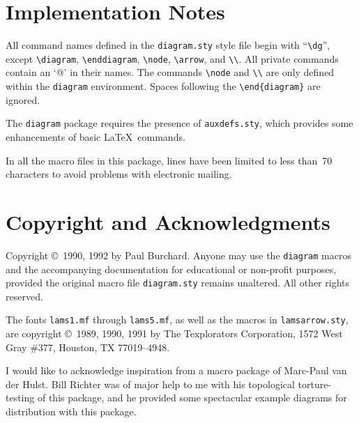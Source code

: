 \section{Implementation Notes}

All command names defined in the \verb"diagram.sty" style file
begin with ``\verb"\dg"'', except \verb"\diagram",
\verb"\enddiagram", \verb"\node", \verb"\arrow",
and \verb"\\".  All private commands contain an `@' in their 
names.  The commands \verb"\node" and \verb"\\" are only defined 
within the \verb"diagram" environment.  Spaces following the 
\verb"\end{diagram}" are ignored.

The \verb"diagram" package requires the presence of \verb"auxdefs.sty",
which provides some enhancements of basic \LaTeX\ commands.

In all the macro files in this package, lines have been limited to
less than~70 characters to avoid problems with electronic mailing.


\section{Copyright and Acknowledgments}

Copyright \copyright\ 1990, 1992 by Paul Burchard.
Anyone may use the \verb"diagram" macros and the accompanying 
documentation for educational or non-profit purposes, provided the 
original macro file \verb"diagram.sty" remains unaltered.  All other 
rights reserved.

The fonts \verb"lams1.mf" through \verb"lams5.mf", as well as the
macros in \verb"lamsarrow.sty", are copyright \copyright\ 1989,
1990, 1991 by The Texplorators Corporation, 1572 West Gray \#377,
Houston, TX 77019--4948.

I would like to acknowledge inspiration from a macro package of 
Marc-Paul van der Hulst.  Bill Richter was of major help to me with 
his topological torture-testing of this package, and he provided
some spectacular example diagrams for distribution with this package.


